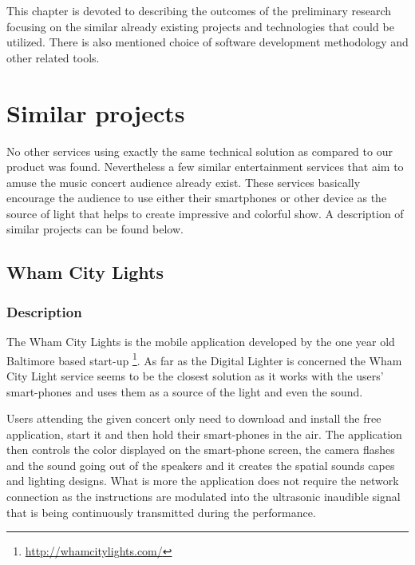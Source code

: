 \label{chap:preliminary_studies}
This chapter is devoted to describing the outcomes of the preliminary research focusing on the similar already existing projects and technologies that could be utilized.
There is also mentioned choice of software development methodology and other related tools.


\section{Similar projects} \label{sec:similar_projects}
No other services using exactly the same technical solution as compared to our product was found.
Nevertheless a few similar entertainment services that aim to amuse the music concert audience already exist. 
These services basically encourage the audience to use either their smartphones or other device as the source of light that helps to create impressive and colorful show.
A description of similar projects can be found below.


\subsection{Wham City Lights}

\subsubsection{Description}
The Wham City Lights is the mobile application developed by the one year old Baltimore based start-up \footnote{\url{http://whamcitylights.com/}}. 
As far as the Digital Lighter is concerned the Wham City Light service seems to be the closest solution as it works with the users' smart-phones and uses them as a source of the light and even the sound.

Users attending the given concert only need to download and install the free application, start it and then hold their smart-phones in the air.
The application then controls the color displayed on the smart-phone screen, the camera flashes and the sound going out of the speakers and it creates the spatial sounds capes and lighting designs.
What is more the application does not require the network connection as the instructions are modulated into the ultrasonic inaudible signal that is being continuously transmitted during the performance.

